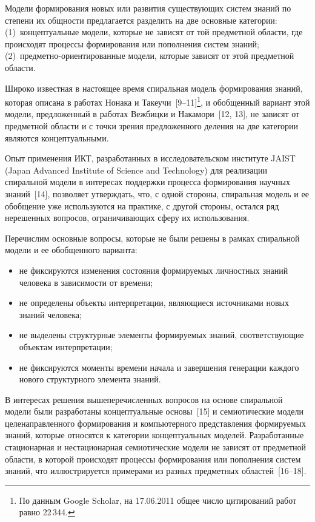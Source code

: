 \begin{multicols}{2}
   Модели формирования новых или развития существующих систем знаний по степени их 
общ\-ности предлагается разделить на две основные категории: (1)~концептуальные модели, 
которые не зависят от той предметной области, где происходят процессы 
формирования или пополнения систем знаний; (2)~пред\-мет\-но-ори\-ен\-ти\-ро\-ван\-ные 
модели, которые зависят от этой предметной области.
   
   Широко известная в настоящее время спиральная модель формирования знаний, которая 
описана в работах Нонака и Такеучи~[9--11]\footnote{По данным Google Scholar, на 17.06.2011 
общее число цитирований работ~\cite{9-zat, 10-zat} равно 22\,344.}, и обобщенный вариант этой модели, 
предложенный в работах Вежбицки и Накамори~[12, 13], не зависят от предметной области 
и с точки зрения предложенного деления на две категории являются концептуальными. 
   
   Опыт применения ИКТ, разработанных в исследовательском институте JAIST (Japan 
Advanced Institute of Science and Technology) для реализации спиральной модели в интересах 
поддержки процесса формирования научных знаний~[14], позволяет утверждать, что, с 
одной стороны, спиральная модель и ее обобщение уже используются на практике, с другой 
стороны, остался ряд нерешенных вопросов, ограничивающих сферу их использования.
   
   Перечислим основные вопросы, которые не были решены в рамках спиральной модели и 
ее обобщенного варианта:
   \begin{itemize} %
\item не фиксируются изменения состояния формируемых личностных знаний человека в 
зависимости от времени;
   \item не определены объекты интерпретации, являющиеся источниками новых знаний 
человека;
   \item не выделены структурные элементы фор\-ми\-ру\-емых знаний, соответствующие 
объектам интерпретации;
   \item не фиксируются моменты времени начала и завершения генерации каждого нового 
структурного элемента знаний.
   \end{itemize}
   
   В интересах решения вышеперечисленных вопросов на основе спиральной модели были 
разработаны концептуальные основы~[15] и семиотические модели целенаправленного 
формирования и компьютерного представления формируемых знаний, которые относятся к 
категории концептуальных моделей. Разработанные стационарная и нестационарная 
семиотические модели не зависят от предметной области, в которой происходят процессы 
формирования или пополнения систем знаний, что иллюстрируется примерами из разных 
предметных областей~[16--18].
   

\end{multicols}
